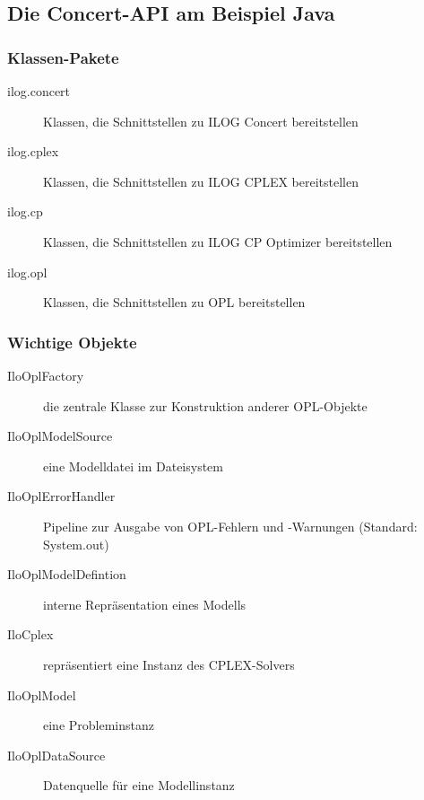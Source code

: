 \subsection{Die Concert-API am Beispiel Java}
\begin{frame}
 \frametitle{Klassen-Pakete}
 \begin{description}
  \item[ilog.concert] Klassen, die Schnittstellen zu ILOG Concert bereitstellen
  \item[ilog.cplex] Klassen, die Schnittstellen zu ILOG CPLEX bereitstellen
  \item[ilog.cp] Klassen, die Schnittstellen zu ILOG CP Optimizer bereitstellen
  \item[ilog.opl] Klassen, die Schnittstellen zu OPL bereitstellen
 \end{description}
\end{frame}

\begin{frame}
 \frametitle{Wichtige Objekte}
 \begin{description}
  \item[IloOplFactory] die zentrale Klasse zur Konstruktion anderer OPL-Objekte
  \item[IloOplModelSource] eine Modelldatei im Dateisystem
  \item[IloOplErrorHandler] Pipeline zur Ausgabe von OPL-Fehlern und -Warnungen (Standard: System.out)
  \item[IloOplModelDefintion] interne Repräsentation eines Modells
  \item[IloCplex] repräsentiert eine Instanz des CPLEX-Solvers
  \item[IloOplModel] eine Probleminstanz
  \item[IloOplDataSource] Datenquelle für eine Modellinstanz
 \end{description}
\end{frame}

